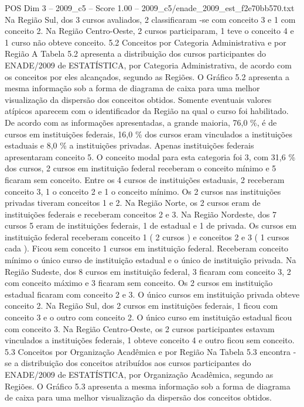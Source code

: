 \begin{textsample}{POS Dim 3 – 2009\_c5 – Score 1.00 – 2009\_c5/enade\_2009\_est\_f2e70bb570.txt}
Na Região Sul, dos 3 cursos avaliados, 2 classificaram -se com conceito 3 e 1 com conceito 2.
Na Região Centro-Oeste, 2 cursos participaram, 1 teve o conceito 4 e 1 curso não obteve conceito. 5.2 Conceitos por Categoria Administrativa e por Região A Tabela 5.2 apresenta a distribuição dos cursos participantes do ENADE/2009 de ESTATÍSTICA, por Categoria Administrativa, de acordo com os conceitos por eles alcançados, segundo as Regiões.
O Gráfico 5.2 apresenta a mesma informação sob a forma de diagrama de caixa para uma melhor visualização da dispersão dos conceitos obtidos.
Somente eventuais valores atípicos aparecem com o identificador da Região na qual o curso foi habilitado.
De acordo com as informações apresentadas, a grande maioria, 76,0 \%, é de cursos em instituições federais, 16,0 \% dos cursos eram vinculados a instituições estaduais e 8,0 \% a instituições privadas.
Apenas instituições federais apresentaram conceito 5.
O conceito modal para esta categoria foi 3, com 31,6 \% dos cursos, 2 cursos em instituição federal receberam o conceito mínimo e 5 ficaram sem conceito.
Entre os 4 cursos de instituições estaduais, 2 receberam conceito 3, 1 o conceito 2 e 1 o conceito mínimo.
Os 2 cursos nas instituições privadas tiveram conceitos 1 e 2.
Na Região Norte, os 2 cursos eram de instituições federais e receberam conceitos 2 e 3.
Na Região Nordeste, dos 7 cursos 5 eram de instituições federais, 1 de estadual e 1 de privada.
Os cursos em instituição federal receberam conceito 1 ( 2 cursos ) e conceitos 2 e 3 ( 1 cursos cada ).
Ficou sem conceito 1 cursos em instituição federal.
Receberam conceito mínimo o único curso de instituição estadual e o único de instituição privada.
Na Região Sudeste, dos 8 cursos em instituição federal, 3 ficaram com conceito 3, 2 com conceito máximo e 3 ficaram sem conceito.
Os 2 cursos em instituição estadual ficaram com conceito 2 e 3.
O único cursos em instituição privada obteve conceito 2.
Na Região Sul, dos 2 cursos em instituições federais, 1 ficou com conceito 3 e o outro com conceito 2.
O único curso em instituição estadual ficou com conceito 3.
Na Região Centro-Oeste, os 2 cursos participantes estavam vinculados a instituições federais, 1 obteve conceito 4 e outro ficou sem conceito. 5.3 Conceitos por Organização Acadêmica e por Região Na Tabela 5.3 encontra -se a distribuição dos conceitos atribuídos aos cursos participantes do ENADE/2009 de ESTATÍSTICA, por Organização Acadêmica, segundo as Regiões.
O Gráfico 5.3 apresenta a mesma informação sob a forma de diagrama de caixa para uma melhor visualização da dispersão dos conceitos obtidos.

\end{textsample}

